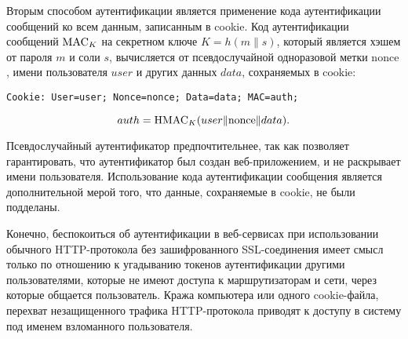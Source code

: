 Вторым способом аутентификации является применение кода аутентификации сообщений ко всем данным, записанным в cookie. Код аутентификации сообщений $\textrm{MAC}_K$ на секретном ключе $K = h(m \| s)$, который является хэшем от пароля $m$ и соли $s$, вычисляется от псевдослучайной одноразовой метки $\textrm{nonce}$, имени пользователя $user$ и других данных $data$, сохраняемых в cookie:
\begin{center} \begin{verbatim}
Cookie: User=user; Nonce=nonce; Data=data; MAC=auth;
\end{verbatim} \end{center}
    \[ auth = \textrm{HMAC}_K(user \| \textrm{nonce} \| data). \]

Псевдослучайный аутентификатор предпочтительнее, так как позволяет гарантировать, что аутентификатор был создан веб-приложением, и не раскрывает имени пользователя. Использование кода аутентификации сообщения является дополнительной мерой того, что данные, сохраняемые в cookie, не были подделаны.

Конечно, беспокоиться об аутентификации в веб-сервисах при использовании обычного HTTP-протокола без зашифрованного SSL-соединения имеет смысл только по отношению к угадыванию токенов аутентификации другими пользователями, которые не имеют доступа к маршрутизаторам и сети, через которые общается пользователь. Кража компьютера или одного cookie-файла, перехват незащищенного трафика HTTP-протокола приводят к доступу в систему под именем взломанного пользователя.

